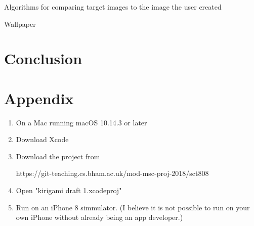 \documentclass[11pt]{article}
\begin{document}
                Algorithms for comparing target images to the image the user created 
                
                
                Wallpaper
                
\newpage
\section{Conclusion}
        
            \paragraph{}

        
\newpage
\let\Section\section 
\def\section*#1{\Section{#1}}  

    
    
\newpage
\Section{Appendix}

        \begin{enumerate}
            \item On a Mac running macOS 10.14.3 or later
            \item Download Xcode
            \item Download the project from 
            
            https://git-teaching.cs.bham.ac.uk/mod-msc-proj-2018/sct808
            \item Open "kirigami draft 1.xcodeproj"
            \item Run on an iPhone 8 simmulator. 
            (I believe it is not possible to run on your own iPhone without already being an app developer.)
      
        \end{enumerate}
        
\end{document}
